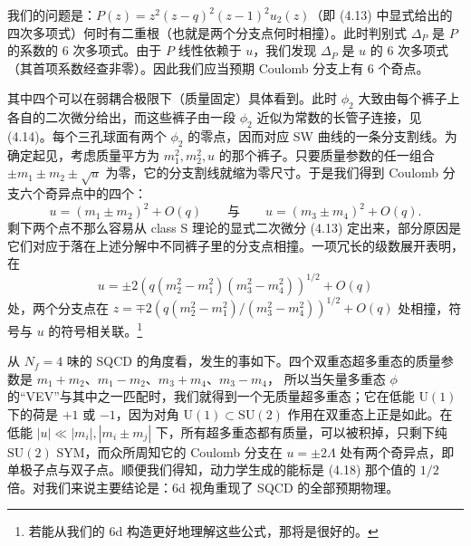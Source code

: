 我们的问题是：$P(z)=z^2(z-q)^2(z-1)^2u_2(z)$（即 (4.13) 中显式给出的四次多项式）何时有二重根（也就是两个分支点何时相撞）。此时判别式 $\Delta_P$ 是 $P$ 的系数的 6 次多项式。由于 $P$ 线性依赖于 $u$，我们发现 $\Delta_P$ 是 $u$ 的 6 次多项式（其首项系数经查非零）。因此我们应当预期 Coulomb 分支上有 6 个奇点。


其中四个可以在弱耦合极限下（质量固定）具体看到。此时 $\phi_2$ 大致由每个裤子上各自的二次微分给出，而这些裤子由一段 $\phi_2$ 近似为常数的长管子连接，见 (4.14)。每个三孔球面有两个 $\phi_2$ 的零点，因而对应 SW 曲线的一条分支割线。为确定起见，考虑质量平方为 $m_1^2,m_2^2,u$ 的那个裤子。只要质量参数的任一组合 $\pm m_1\pm m_2\pm\sqrt{u}$ 为零，它的分支割线就缩为零尺寸。于是我们得到 Coulomb 分支六个奇异点中的四个：
\begin{equation}
  u=(m_1\pm m_2)^2+O(q)
  \qquad\text{与}\qquad
  u=(m_3\pm m_4)^2+O(q).
  \tag{4.17}
\end{equation}
剩下两个点不那么容易从 class S 理论的显式二次微分 (4.13) 定出来，部分原因是它们对应于落在上述分解中不同裤子里的分支点相撞。一项冗长的级数展开表明，在
\begin{equation}
  u=\pm2\left(q(m_2^2-m_1^2)(m_3^2-m_4^2)\right)^{1/2}+O(q)
  \tag{4.18}
\end{equation}
处，两个分支点在 $z=\mp2\left(q(m_2^2-m_1^2)/(m_3^2-m_4^2)\right)^{1/2}+O(q)$ 处相撞，符号与 $u$ 的符号相关联。\footnote{若能从我们的 6d 构造更好地理解这些公式，那将是很好的。}


从 $N_f=4$ 味的 SQCD 的角度看，发生的事如下。四个双重态超多重态的质量参数是 $m_1+m_2$、$m_1-m_2$、$m_3+m_4$、$m_3-m_4$，
所以当矢量多重态 $\phi$ 的“VEV”与其中之一匹配时，我们就得到一个无质量超多重态；它在低能 $\mathrm{U}(1)$ 下的荷是 $+1$ 或 $-1$，因为对角 $\mathrm{U}(1)\subset\mathrm{SU}(2)$ 作用在双重态上正是如此。在低能 $|u|\ll|m_i|,|m_i\pm m_j|$ 下，所有超多重态都有质量，可以被积掉，只剩下纯 $\mathrm{SU}(2)$ SYM，而众所周知它的 Coulomb 分支在 $u=\pm2\Lambda$ 处有两个奇异点，即单极子点与双子点。顺便我们得知，动力学生成的能标是 (4.18) 那个值的 $1/2$ 倍。对我们来说主要结论是：6d 视角重现了 SQCD 的全部预期物理。

